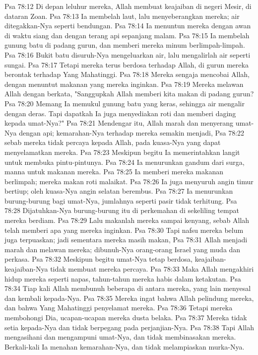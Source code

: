 Psa 78:12  Di depan leluhur mereka, Allah membuat keajaiban di negeri Mesir, di dataran Zoan.
Psa 78:13  Ia membelah laut, lalu menyeberangkan mereka; air ditegakkan-Nya seperti bendungan.
Psa 78:14  Ia menuntun mereka dengan awan di waktu siang dan dengan terang api sepanjang malam.
Psa 78:15  Ia membelah gunung batu di padang gurun, dan memberi mereka minum berlimpah-limpah.
Psa 78:16  Bukit batu disuruh-Nya mengeluarkan air, lalu mengalirlah air seperti sungai.
Psa 78:17  Tetapi mereka terus berdosa terhadap Allah, di gurun mereka berontak terhadap Yang Mahatinggi.
Psa 78:18  Mereka sengaja mencobai Allah, dengan menuntut makanan yang mereka inginkan.
Psa 78:19  Mereka melawan Allah dengan berkata, "Sanggupkah Allah memberi kita makan di padang gurun?
Psa 78:20  Memang Ia memukul gunung batu yang keras, sehingga air mengalir dengan deras. Tapi dapatkah Ia juga menyediakan roti dan memberi daging kepada umat-Nya?"
Psa 78:21  Mendengar itu, Allah marah dan menyerang umat-Nya dengan api; kemarahan-Nya terhadap mereka semakin menjadi,
Psa 78:22  sebab mereka tidak percaya kepada Allah, pada kuasa-Nya yang dapat menyelamatkan mereka.
Psa 78:23  Meskipun begitu Ia memerintahkan langit untuk membuka pintu-pintunya.
Psa 78:24  Ia menurunkan gandum dari surga, manna untuk makanan mereka.
Psa 78:25  Ia memberi mereka makanan berlimpah; mereka makan roti malaikat.
Psa 78:26  Ia juga menyuruh angin timur bertiup; oleh kuasa-Nya angin selatan berembus.
Psa 78:27  Ia menurunkan burung-burung bagi umat-Nya, jumlahnya seperti pasir tidak terhitung.
Psa 78:28  Dijatuhkan-Nya burung-burung itu di perkemahan di sekeliling tempat mereka berdiam.
Psa 78:29  Lalu makanlah mereka sampai kenyang, sebab Allah telah memberi apa yang mereka inginkan.
Psa 78:30  Tapi nafsu mereka belum juga terpuaskan; jadi sementara mereka masih makan,
Psa 78:31  Allah menjadi marah dan melawan mereka; dibunuh-Nya orang-orang Israel yang muda dan perkasa.
Psa 78:32  Meskipun begitu umat-Nya tetap berdosa, keajaiban-keajaiban-Nya tidak membuat mereka percaya.
Psa 78:33  Maka Allah mengakhiri hidup mereka seperti napas, tahun-tahun mereka habis dalam ketakutan.
Psa 78:34  Tiap kali Allah membunuh beberapa di antara mereka, yang lain menyesal dan kembali kepada-Nya.
Psa 78:35  Mereka ingat bahwa Allah pelindung mereka, dan bahwa Yang Mahatinggi penyelamat mereka.
Psa 78:36  Tetapi mereka membohongi Dia, ucapan-ucapan mereka dusta belaka.
Psa 78:37  Mereka tidak setia kepada-Nya dan tidak berpegang pada perjanjian-Nya.
Psa 78:38  Tapi Allah mengasihani dan mengampuni umat-Nya, dan tidak membinasakan mereka. Berkali-kali Ia menahan kemarahan-Nya, dan tidak melampiaskan murka-Nya.
